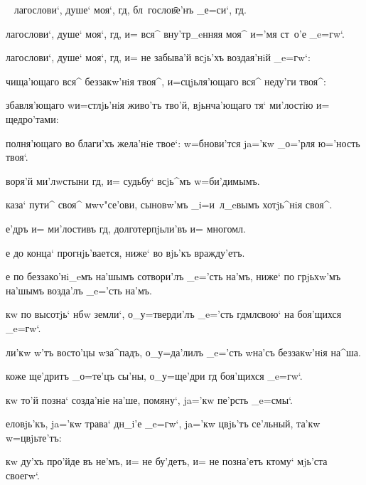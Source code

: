 \documentclass[12pt,twoside,a6paper,dvips,civil=antiqua,cs=izhitsa]{hipbook}
\newcommand{\xpref}[1]{\rem{#1:}\ }
\renewcommand{\*}{~~\raise3pt\hbox{\footnotesize*}}
\begin{document}
{
  
\xpref{_Псало'мъ р~в} {\large{}лагослови`, душе` моя`, гд,
    бл~госло\=ве'нъ _е=си`, гд.
}
  
{\large{}лагослови`, душе` моя`, гд, и= вся^ вну'тр_eнняя
  моя^ и='мя ст~о'е _e=гw`.\par}

{\large{}лагослови`, душе` моя`, гд, и= не забыва'й всjь'хъ
воздая'нiй _e=гw`:\par}

{\large{}чища'ющаго вся^ беззакw'нiя твоя^, и=сцjьля'ющаго
вся^ неду'ги твоя^:\par}

збавля'ющаго w\т и=стлjь'нiя живо'тъ тво'й, вjьнча'ющаго тя`
ми'лостiю и= щедро'тами:

полня'ющаго во благи'хъ жела'нiе твое`: w=бнови'тся
ja='кw _о='рля ю='ность твоя`.

воря'й ми'лwстыни гд, и= судьбу` всjь^мъ w=би'димымъ.

каза` пути^ своя^ мwv"се'ови, сыновw'мъ _i=и~л_eвымъ хотjь^нiя своя^.

{\large{}е'дръ и= ми'лостивъ гд, долготерпjьли'въ и= многомл.}

е до конца` прогнjь'вается, ниже` во вjь'къ вражду'етъ.

е по
беззако'нi_eмъ на'шымъ сотвори'лъ _e='сть на'мъ, ниже` по грjьхw'мъ
на'шымъ возда'лъ _e='сть на'мъ. 

кw по высотjь` нб w\т
земли`, о_у=тверди'лъ _e='сть гд мл свою` на боя'щихся _e=гw`.

ли'кw w'тъ восто'цы w\т за^падъ, о_у=да'лилъ _e='сть w\т на'съ
беззакw'нiя на^ша. 

коже ще'дритъ _о=те'цъ сы'ны, о_у=ще'дри гд
боя'щихся _e=гw`. 

кw то'й позна` созда'нiе на'ше, помяну`, ja='кw
пе'рсть _e=смы`. 

еловjь'къ, ja='кw трава` дн_i'е _e=гw`, ja='кw
цвjь'тъ се'льный, та'кw w=цвjьте'тъ: 

кw ду'хъ про'йде въ не'мъ, и=
не бу'детъ, и= не позна'етъ ктому` мjь'ста своегw`. 

}
\end{document}
